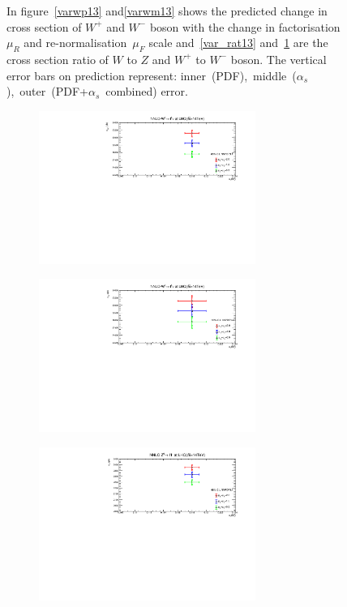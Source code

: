 \begin{figure}[H]
\begin{subfigure}{0.8\textwidth}
\vspace*{-8mm}
\caption{}
\label{var_rat131}
\end{subfigure}
\caption{In figure~\ref{varwp13} and\ref{varwm13} shows the predicted change in cross section of $W^{+}$ and $W^{-}$ boson with the change in factorisation~$\mu_{R}$ and re-normalisation~$\mu_{F}$ scale and~\ref{var_rat13} and~\ref{var_rat131} are the cross section ratio of $W$ to $Z$ and $W^{+}$ to $W^{-}$  boson. The vertical error bars on prediction represent: inner~(PDF),~middle~($\alpha_{s}$),~outer~(PDF+$\alpha_{s}$~combined) error.}
\label{comp1}
\end{figure}


\begin{figure}[H]
\centering
\begin{subfigure}{0.8\textwidth}
\includegraphics[height=5cm ,width=\textwidth]{chapter4/Comp14_68.pdf}
\vspace*{-8mm}
\caption{}
\label{var_14-1}
\end{subfigure}
\begin{subfigure}{0.8\textwidth}
\includegraphics[height=5cm, width=\textwidth]{chapter4/Comp14_90.pdf}
\vspace*{-8mm}
\caption{}
\label{var_14-2}
\end{subfigure}
\begin{subfigure}{0.8\textwidth}
\includegraphics[height=5cm, width=\textwidth]{chapter4/CompZ14_68.pdf}

\end{subfigure}
\end{figure}

